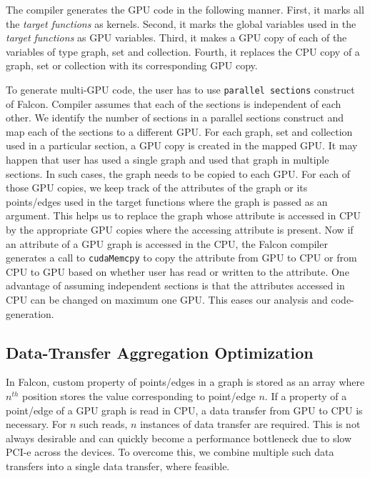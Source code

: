 The compiler generates the GPU code in the following manner.
First, it marks all the \textit{target functions} as kernels.
Second, it marks the global variables used in the \textit{target functions} as GPU variables.
Third, it makes a GPU copy of each of the variables of type graph, set and collection.
Fourth, it replaces the CPU copy of a graph, set or collection with its corresponding GPU copy.

To generate multi-GPU code, the user has to use \texttt{parallel sections} construct of Falcon.
Compiler assumes that each of the sections is independent of each other.
We identify the number of sections in a parallel sections construct and map each of the sections to a different GPU.
For each graph, set and collection used in a particular section, a GPU copy is created in the mapped GPU.
It may happen that user has used a single graph and used that graph in multiple sections.
In such cases, the graph needs to be copied to each GPU.
For each of those GPU copies, we keep track of the attributes of the graph or its points/edges used in the target functions where the graph is passed as an argument.
This helps us to replace the graph whose attribute is accessed in CPU by the appropriate GPU copies where the accessing attribute is present.
Now if an attribute of a GPU graph is accessed in the CPU, the Falcon compiler generates a call to \texttt{cudaMemcpy} to copy the attribute from GPU to CPU or from CPU to GPU based on whether user has read or written to the attribute.
One advantage of assuming independent sections is that the attributes accessed in CPU can be changed on maximum one GPU.
This eases our analysis and code-generation.


\subsection{Data-Transfer Aggregation Optimization}\label{sec:optimizations}
In Falcon, custom property of points/edges in a graph is stored as an array where $n^{th}$ position stores the value corresponding to point/edge $n$.
If a property of a point/edge of a GPU graph is read in CPU, a data transfer from GPU to CPU is necessary.
For $n$ such reads, $n$ instances of data transfer are required.
This is not always desirable and can quickly become a performance bottleneck due to slow PCI-e across the devices. 
To overcome this, we combine multiple such data transfers into a single data transfer, where feasible.


